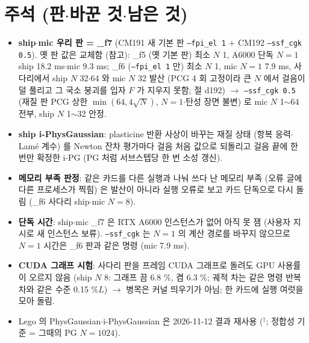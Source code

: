 \section*{주석 (판$\cdot$바꾼 것$\cdot$남은 것)}
\begin{itemize}
\item \textbf{ship$\cdot$mic 우리 판 = \_f7} (CM191 새 기본 판 \texttt{--fpi\_el 1} + CM192 \texttt{--ssf\_cgk 0.5}). 옛 판 값은 교체함 (참고): \_f5 (옛 기본 판) 최소 $N$ 1, A6000 단독 $N{=}1$ ship 18.2 ms$\cdot$mic 9.3 ms; \_f6 (\texttt{--fpi\_el 1} 만) 최소 $N$ 1, mic $N{=}1$ 7.9 ms, 사다리에서 ship $N$ 32$\cdot$64 와 mic $N$ 32 발산 (PCG 4 회 고정이라 큰 $N$ 에서 걸음이 덜 풀리고 그 국소 붕괴를 입자 $F$ 가 지우지 못함; 절 d192) $\to$ \texttt{--ssf\_cgk 0.5} (재질 판 PCG 상한 $\min(64, 4\sqrt N)$, $N{=}1$$\cdot$탄성 장면 불변) 로 mic $N$ 1$\sim$64 전부, ship $N$ 1$\sim$32 안정.
\item \textbf{ship i-PhysGaussian}: plasticine 반환 사상이 바꾸는 재질 상태 (항복 응력$\cdot$Lam\'e 계수) 를 Newton 잔차 평가마다 걸음 처음 값으로 되돌리고 걸음 끝에 한 번만 확정한 i-PG (PG 처럼 서브스텝당 한 번 소성 갱신).
\item \textbf{메모리 부족 판정}: 같은 카드를 다른 실행과 나눠 쓰다 난 메모리 부족 (오류 글에 다른 프로세스가 찍힘) 은 발산이 아니라 실행 오류로 보고 카드 단독으로 다시 돌림 (\_f6 사다리 ship$\cdot$mic $N{=}8$).
\item \textbf{단독 시간}: ship$\cdot$mic \_f7 은 RTX A6000 인스턴스가 없어 아직 못 잼 (사용자 지시로 새 인스턴스 보류). \texttt{--ssf\_cgk} 는 $N{=}1$ 의 계산 경로를 바꾸지 않으므로 $N{=}1$ 시간은 \_f6 판과 같은 명령 (mic 7.9 ms).
\item \textbf{CUDA 그래프 시험}: 사다리 판을 프레임 CUDA 그래프로 돌려도 GPU 사용률이 오르지 않음 (ship $N$ 8: 그래프 끔 6.8 \%, 켬 6.3 \%; 궤적 차는 같은 명령 반복 차와 같은 수준 0.15 \%$L$) $\to$ 병목은 커널 띄우기가 아님; 한 카드에 실행 여럿을 모아 돌림.
\item Lego 의 PhysGaussian$\cdot$i-PhysGaussian 은 2026-11-12 결과 재사용 ($^\dagger$; 정합성 기준 = 그때의 PG $N{=}1024$).
\end{itemize}
